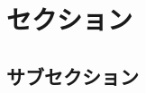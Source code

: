 \documentclass[a4j, 10pt]{jarticle}
\begin{document}
\section{セクション}
\subsection{サブセクション}
\end{document}
